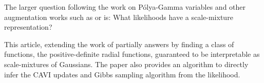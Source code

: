 


\graphicspath{{5/figures/}}

The larger question following the work on P\'olya-Gamma variables and other augmentation works such as \citet{nguyenRobustStudentSt2012} or \citet{henaoBayesianNonlinearSupport2014} is:
What likelihoods have a scale-mixture representation?

This article, extending the work of \citet{palmer2006variational} partially answers by finding a class of functions, the positive-definite radial functions, guaranteed to be interpretable as scale-mixtures of Gaussians.
The paper also provides an algorithm to directly infer the \ac{CAVI} updates and Gibbs sampling algorithm from the likelihood.

